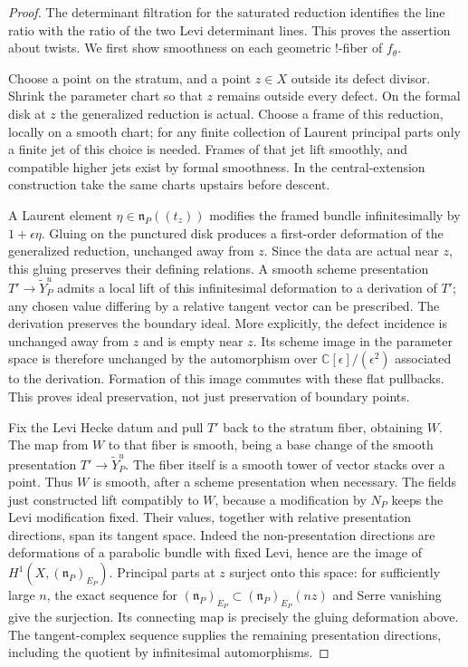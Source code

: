 \documentclass[11pt]{article}
\numberwithin{equation}{section}
\theoremstyle{definition}
\theoremstyle{remark}
\begin{document}
\begin{proof}
The determinant filtration for the saturated reduction identifies the line
ratio with the ratio of the two Levi determinant lines.  This proves the
assertion about twists.  We first show smoothness on each geometric
!-fiber of $f_\theta$.

Choose a point on the stratum, and a point $z\in X$ outside its defect divisor.
Shrink the parameter chart so that $z$ remains outside every defect.  On the
formal disk at $z$ the generalized reduction is actual.  Choose a frame of
this reduction, locally on a smooth chart; for any finite collection of
Laurent principal parts only a finite jet of this choice is needed.  Frames
of that jet lift smoothly, and compatible higher jets exist by formal
smoothness.  In the central-extension construction take the same charts
upstairs before descent.

A Laurent element $\eta\in\mathfrak n_P((t_z))$ modifies the framed bundle
infinitesimally by $1+\epsilon\eta$.  Gluing on the punctured disk produces a
first-order deformation of the generalized reduction, unchanged away from
$z$.  Since the data are actual near $z$, this gluing preserves their defining
relations.  A smooth scheme presentation $T'\to\widetilde Y_P^u$ admits a
local lift of this infinitesimal deformation to a derivation of $T'$; any
chosen value differing by a relative tangent vector can be prescribed.
The derivation preserves the boundary ideal.  More explicitly, the defect
incidence is unchanged away from $z$ and is empty near $z$.  Its scheme image
in the parameter space is therefore unchanged by the automorphism over
$\mathbb C[\epsilon]/(\epsilon^2)$ associated to the derivation.  Formation
of this image commutes with these flat pullbacks.  This proves ideal
preservation, not just preservation of boundary points.

Fix the Levi Hecke datum and pull $T'$ back to the stratum fiber, obtaining
$W$.  The map from $W$ to that fiber is smooth, being a base change of the
smooth presentation $T'\to\widetilde Y_P^u$.  The fiber itself is a smooth
tower of vector stacks over a point.  Thus $W$ is smooth, after a scheme
presentation when necessary.
The fields just constructed lift compatibly to $W$, because a modification
by $N_P$ keeps the Levi modification fixed.  Their values, together with
relative presentation directions, span its tangent space.  Indeed the
non-presentation directions are deformations of a parabolic bundle with
fixed Levi, hence are the image of
$H^1(X,(\mathfrak n_P)_{E_P})$.  Principal parts at $z$ surject onto this
space: for sufficiently large $n$, the exact sequence for
$(\mathfrak n_P)_{E_P}\subset(\mathfrak n_P)_{E_P}(nz)$ and Serre vanishing
give the surjection.  Its connecting map is precisely the gluing deformation
above.  The tangent-complex sequence supplies the remaining presentation
directions, including the quotient by infinitesimal automorphisms.


\end{proof}
\end{document}
